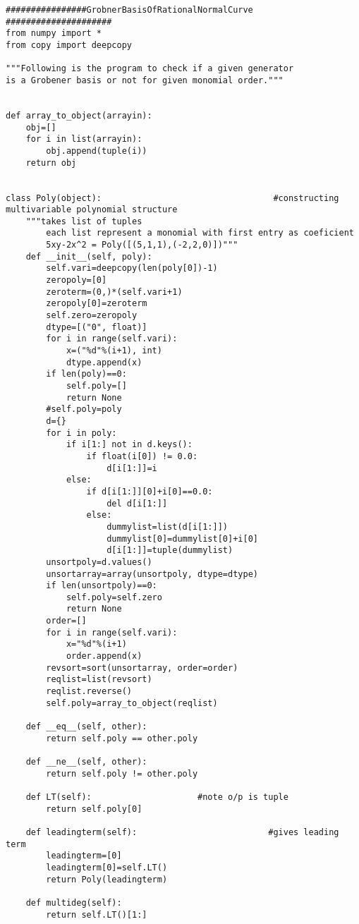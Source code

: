 \documentclass[12pt,a4paper]{article}
\theoremstyle{definition}
\begin{document}
\begin{verbatim}
################GrobnerBasisOfRationalNormalCurve #####################
from numpy import *
from copy import deepcopy

"""Following is the program to check if a given generator
is a Grobener basis or not for given monomial order."""


def array_to_object(arrayin):
    obj=[]
    for i in list(arrayin):
        obj.append(tuple(i))
    return obj


class Poly(object):                                  #constructing multivariable polynomial structure
    """takes list of tuples
        each list represent a monomial with first entry as coeficient
        5xy-2x^2 = Poly([(5,1,1),(-2,2,0)])"""
    def __init__(self, poly):
        self.vari=deepcopy(len(poly[0])-1)
        zeropoly=[0]
        zeroterm=(0,)*(self.vari+1)
        zeropoly[0]=zeroterm
        self.zero=zeropoly
        dtype=[("0", float)]
        for i in range(self.vari):
            x=("%d"%(i+1), int)
            dtype.append(x)
        if len(poly)==0:
            self.poly=[]
            return None
        #self.poly=poly 
        d={}
        for i in poly:
            if i[1:] not in d.keys():
                if float(i[0]) != 0.0:
                    d[i[1:]]=i
            else:
                if d[i[1:]][0]+i[0]==0.0:
                    del d[i[1:]]
                else:
                    dummylist=list(d[i[1:]])
                    dummylist[0]=dummylist[0]+i[0]
                    d[i[1:]]=tuple(dummylist)
        unsortpoly=d.values()
        unsortarray=array(unsortpoly, dtype=dtype)
        if len(unsortpoly)==0:
            self.poly=self.zero
            return None
        order=[]
        for i in range(self.vari):
            x="%d"%(i+1)
            order.append(x)
        revsort=sort(unsortarray, order=order)
        reqlist=list(revsort)
        reqlist.reverse()
        self.poly=array_to_object(reqlist)

    def __eq__(self, other):
        return self.poly == other.poly

    def __ne__(self, other):
        return self.poly != other.poly

    def LT(self):                     #note o/p is tuple 
        return self.poly[0]

    def leadingterm(self):                          #gives leading term
        leadingterm=[0]
        leadingterm[0]=self.LT()
        return Poly(leadingterm)

    def multideg(self):
        return self.LT()[1:]


\end{verbatim}
\end{document}
